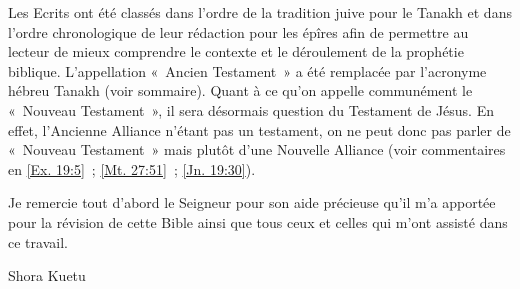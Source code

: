 \begin{small}
Les Ecrits ont été classés dans l'ordre de la tradition juive pour le Tanakh et dans l'ordre chronologique de leur rédaction pour les épîres afin de permettre au lecteur de mieux comprendre le contexte et le déroulement de la prophétie biblique. L'appellation «~Ancien Testament~» a été remplacée par l'acronyme hébreu Tanakh (voir sommaire). Quant à ce qu'on appelle communément le «~Nouveau Testament~», il sera désormais question du Testament de Jésus. En effet, l'Ancienne Alliance n'étant pas un testament, on ne peut donc pas parler de «~Nouveau Testament~» mais plutôt d'une Nouvelle Alliance (voir commentaires en \vref{Ex. 19:5}~; \vref{Mt. 27:51}~; \vref{Jn. 19:30}).

Je remercie tout d'abord le Seigneur pour son aide précieuse qu'il m'a apportée pour la révision de cette Bible ainsi que tous ceux et celles qui m'ont assisté dans ce travail.

Shora Kuetu
\end{small}
